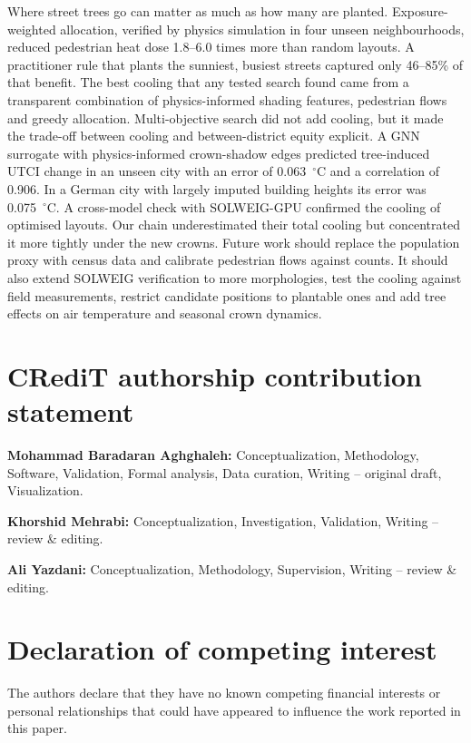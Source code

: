\documentclass[preprint,12pt,authoryear]{elsarticle}
\newcommand{\degC}{\ensuremath{^\circ}C}
\begin{document}
Where street trees go can matter as much as how many are planted. Exposure-weighted allocation, verified by physics simulation in four unseen neighbourhoods, reduced pedestrian heat dose 1.8--6.0 times more than random layouts. A practitioner rule that plants the sunniest, busiest streets captured only 46--85\% of that benefit. The best cooling that any tested search found came from a transparent combination of physics-informed shading features, pedestrian flows and greedy allocation. Multi-objective search did not add cooling, but it made the trade-off between cooling and between-district equity explicit. A GNN surrogate with physics-informed crown-shadow edges predicted tree-induced UTCI change in an unseen city with an error of 0.063~\degC{} and a correlation of 0.906. In a German city with largely imputed building heights its error was 0.075~\degC. A cross-model check with SOLWEIG-GPU confirmed the cooling of optimised layouts. Our chain underestimated their total cooling but concentrated it more tightly under the new crowns. Future work should replace the population proxy with census data and calibrate pedestrian flows against counts. It should also extend SOLWEIG verification to more morphologies, test the cooling against field measurements, restrict candidate positions to plantable ones and add tree effects on air temperature and seasonal crown dynamics.

\section*{CRediT authorship contribution statement}
\noindent\textbf{Mohammad Baradaran Aghghaleh:} Conceptualization, Methodology, Software, Validation, Formal analysis, Data curation, Writing -- original draft, Visualization.\par
\noindent\textbf{Khorshid Mehrabi:} Conceptualization, Investigation, Validation, Writing -- review \& editing.\par
\noindent\textbf{Ali Yazdani:} Conceptualization, Methodology, Supervision, Writing -- review \& editing.

\section*{Declaration of competing interest}
The authors declare that they have no known competing financial interests or personal relationships that could have appeared to influence the work reported in this paper.
\end{document}
